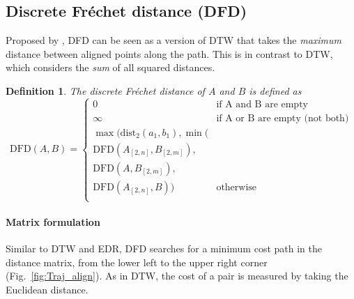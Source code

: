 \documentclass{interact}
\newcommand{\dist}{\ensuremath{\text{dist}}}
\newcommand{\DFD}{\ensuremath{\text{DFD}}}
\newtheorem{definition}{Definition}
\begin{document}

\subsection{Discrete Fréchet distance (DFD)}
Proposed by \cite{Wien94computingdiscrete}, DFD can be seen as a version of DTW that takes the \emph{maximum} distance between aligned points along the path. This is in contrast to DTW, which considers the \emph{sum} of all squared distances.

\begin{definition}
The discrete Fr\'echet distance of $A$ and $B$ is defined as
\[
\DFD(A,B) =
\left\{
	\begin{array}{ll}
		0  & \mbox{if A and B are empty} \\
		\infty  & \mbox{if A or B are empty (not both)} \\
		\max( \dist_2(a_1,b_1),
		\min( \\
	\DFD(A_{[2,n]},B_{[2,m]}), \\
			  \DFD(A,B_{[2,m]}),  \\
			\DFD(A_{[2,n]},B)) & \mbox{otherwise } \\
		\end{array}
\right.
\]
\end{definition}

\paragraph*{Matrix formulation}
Similar to DTW and EDR, DFD searches for a minimum cost path in the distance matrix, from the lower left to the upper right corner (Fig.~\ref{fig:Traj_align}). As in DTW, the cost of a pair is measured by taking the Euclidean distance.

%
\end{document}
